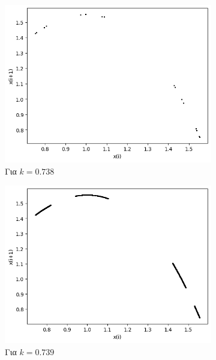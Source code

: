 \begin{figure}[ht]
	\centering
	\begin{subfigure}[b]{0.4\textwidth}
		\centering
		\includegraphics[width=\textwidth]{LateX images/graphs q14/g17}
		\caption{Για $k=0.738$}
		\label{f:k74}
	\end{subfigure}
	\hfill
	\begin{subfigure}[b]{0.4\textwidth}
		\centering
		\includegraphics[width=\textwidth]{LateX images/graphs q14/g18}
		\caption{Για $k=0.739$}
		\label{f:k75}
	\end{subfigure}
	\hfill
	\begin{subfigure}[b]{0.4\textwidth}
		\centering

\end{subfigure}
\end{figure}
